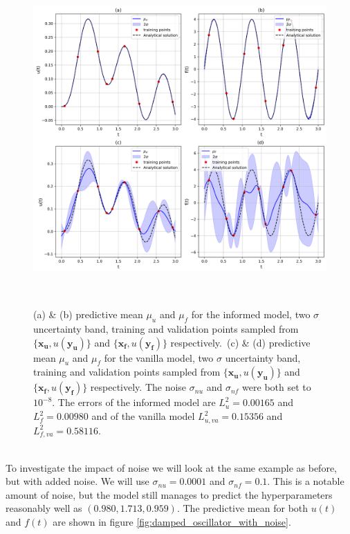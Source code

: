 \documentclass{article}
\begin{document}
\begin{figure}[htbp!]
    \centering
    \includegraphics[width=1\textwidth]{../final_examples/oscillator/merged_1d_plots.png}
    \caption{(a) \& (b) predictive mean $\mu_u$ and $\mu_f$ for the informed model, two $\sigma$ uncertainty band, training and validation points sampled from $\{\bm{x_u},u(\bm{y_u})\}$ and $\{\bm{x_f},u(\bm{y_f})\}$ respectively.\ (c) \& (d) predictive mean $\mu_u$ and $\mu_f$ for the vanilla model, two $\sigma$ uncertainty band, training and validation points sampled from $\{\bm{x_u},u(\bm{y_u})\}$ and $\{\bm{x_f},u(\bm{y_f})\}$ respectively. The noise $\sigma_{nu}$ and $\sigma_{nf}$ were both set to $10^{-8}$. The errors of the informed model are $L^2_u = 0.00165$ and $L^2_f = 0.00980$ and of the vanilla model $L^2_{u,va} = 0.15356$ and $L^2_{f,va} = 0.58116$.}
    ~\label{fig:damped_oscillator}
\end{figure}
\\
To investigate the impact of noise we will look at the same example as before, but with added noise. We will use $\sigma_{nu} = 0.0001$ and $\sigma_{nf} = 0.1$. This is a notable amount of noise, but the model still manages to predict the hyperparameters reasonably well as $(0.980,1.713,0.959)$. The predictive mean for both $u(t)$ and $f(t)$ are shown in figure \ref{fig:damped_oscillator_with_noise}.
\end{document}
